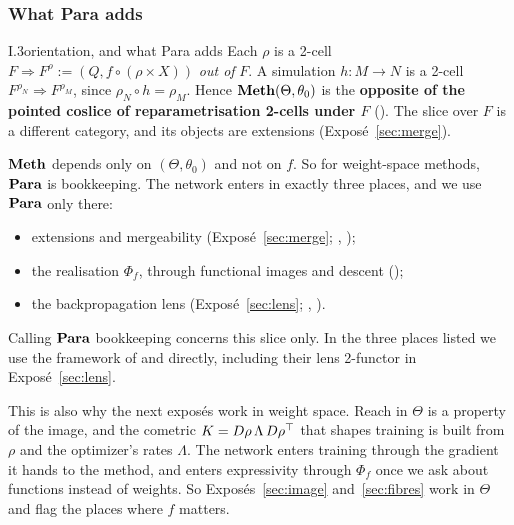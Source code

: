 \subsubsection{What Para adds}\label{sec:slice-para}

\begin{remark}{I.3}{orientation, and what Para adds}
Each $\rho$ is a 2-cell $F\Rightarrow F^\rho:=(Q,f\circ(\rho\times X))$ \emph{out of} $F$. A simulation $h:M\to N$ is a
2-cell $F^{\rho_N}\Rightarrow F^{\rho_M}$, since $\rho_N\circ h=\rho_M$. Hence $\mathbf{Meth}(\Theta,\theta_0)$ is the
\textbf{opposite of the pointed coslice of reparametrisation 2-cells under $F$} (). The slice over $F$ is a
different category, and its objects are extensions (Exposé~\ref{sec:merge}).

$\mathbf{Meth}$ depends only on $(\Theta,\theta_0)$ and not on $f$. So for weight-space methods, $\mathbf{Para}$ is bookkeeping. The
network enters in exactly three places, and we use $\mathbf{Para}$ only there:
\begin{itemize}
  \item extensions and mergeability (Exposé~\ref{sec:merge}; , );
  \item the realisation $\Phi_f$, through functional images and descent ();
  \item the backpropagation lens (Exposé~\ref{sec:lens}; , ).
\end{itemize}
\end{remark}

Calling $\mathbf{Para}$ bookkeeping concerns this slice only. In the three places listed we use the framework of
\citet{fong2017backprop} and \citet{cruttwell2021categorical} directly, including their lens 2-functor in
Exposé~\ref{sec:lens}.

This is also why the next exposés work in weight space. Reach in $\Theta$ is a property of the image, and the cometric
$K=D\rho\,\Lambda\,D\rho^{\top}$ that shapes training is built from $\rho$ and the optimizer's rates $\Lambda$. The network
enters training through the gradient it hands to the method, and enters expressivity through $\Phi_f$ once we ask about
functions instead of weights. So Exposés~\ref{sec:image} and~\ref{sec:fibres} work in $\Theta$ and flag the places where
$f$ matters.

